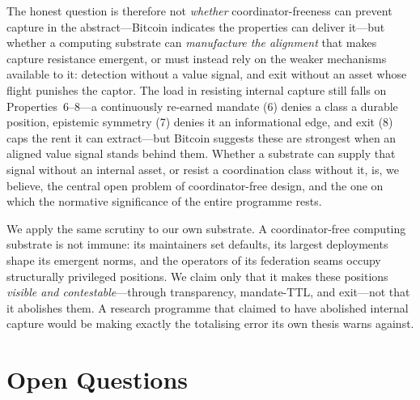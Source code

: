 \documentclass[11pt]{article}
\theoremstyle{definition}
\theoremstyle{plain}
\begin{document}
The honest question is therefore not \emph{whether} coordinator-freeness can prevent
capture in the abstract---Bitcoin indicates the properties can deliver it---but whether a
computing substrate can \emph{manufacture the alignment} that makes capture
resistance emergent, or must instead rely on the weaker mechanisms available to it:
detection without a value signal, and exit without an asset whose flight punishes the
captor. The load in resisting internal capture still falls on Properties~6--8---a
continuously re-earned mandate (6) denies a class a durable position, epistemic
symmetry (7) denies it an informational edge, and exit (8) caps the rent it can
extract---but Bitcoin suggests these are strongest when an aligned value signal stands
behind them. Whether a substrate can supply that signal without an internal asset,
or resist a coordination class without it, is, we believe, the central open problem
of coordinator-free design, and the one on which the normative significance of the
entire programme rests.

We apply the same scrutiny to our own substrate. A coordinator-free computing
substrate is not immune: its maintainers set defaults, its largest deployments
shape its emergent norms, and the operators of its federation seams occupy
structurally privileged positions. We claim only that it makes these positions
\emph{visible and contestable}---through transparency, mandate-TTL, and exit---not
that it abolishes them. A research programme that claimed to have abolished internal
capture would be making exactly the totalising error its own thesis warns against.

\section{Open Questions}
\label{sec:open}
\end{document}
